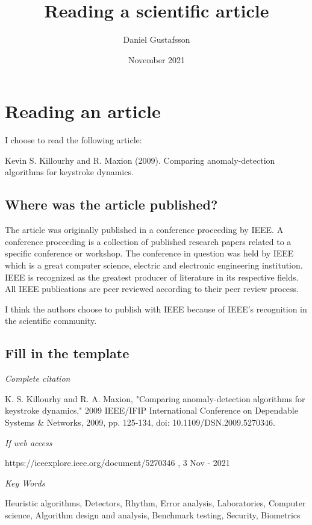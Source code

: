 \documentclass[11pt, a4paper]{article}
\title{Reading a scientific article}
\author{Daniel Gustafsson}
\date{November 2021}
\begin{document}
\maketitle

\section{Reading an article}
I choose to read the following article:

Kevin S. Killourhy and R. Maxion (2009). Comparing anomaly-detection algorithms for keystroke dynamics.

\subsection{Where was the article published?}

The article was originally published in a conference proceeding by IEEE.
A conference proceeding is a collection of published research papers related to a specific conference or workshop.
The conference in question was held by IEEE which is a great computer science, electric and electronic engineering institution.
IEEE is recognized as the greatest producer of literature in its respective fields.
All IEEE publications are peer reviewed according to their peer review process.

I think the authors choose to publish with IEEE because of IEEE's recognition in the scientific community.

\subsection{Fill in the template}
\textit{Complete citation}

K. S. Killourhy and R. A. Maxion, 
"Comparing anomaly-detection algorithms for keystroke dynamics,"
2009 IEEE/IFIP International Conference on Dependable Systems \& Networks,
2009, pp. 125-134,
doi: 10.1109/DSN.2009.5270346.

\vspace{2mm}\noindent\textit{If web access}

https://ieeexplore.ieee.org/document/5270346 , 3 Nov - 2021

\vspace{2mm}\noindent\textit{Key Words}

Heuristic algorithms,
Detectors,
Rhythm,
Error analysis,
Laboratories,
Computer science,
Algorithm design and analysis,
Benchmark testing,
Security,
Biometrics
\end{document}
